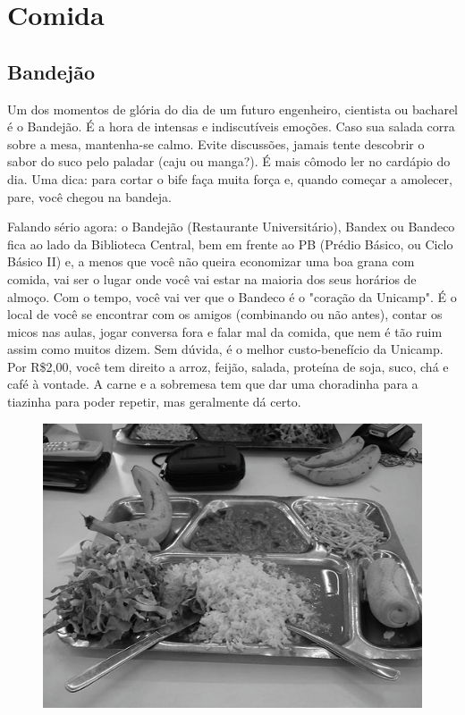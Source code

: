 
\section{Comida}
\subsection{Bandejão}

Um dos momentos de glória do dia de um futuro engenheiro, cientista ou bacharel
é o Bandejão. É a hora de intensas e indiscutíveis emoções. Caso sua salada
corra sobre a mesa, mantenha-se calmo. Evite discussões, jamais tente descobrir
o sabor do suco pelo paladar (caju ou manga?). É mais cômodo ler no cardápio
do dia. Uma dica: para cortar o bife faça muita força e, quando começar
a amolecer, pare, você chegou na bandeja.

Falando sério agora: o Bandejão (Restaurante Universitário), Bandex ou Bandeco
fica ao lado da Biblioteca Central, bem em frente ao PB (Prédio Básico, ou Ciclo
Básico II) e, a menos que você não queira economizar uma boa grana com comida,
vai ser o lugar onde você vai estar na maioria dos seus horários de almoço. Com
o tempo, você vai ver que o Bandeco é o "coração da Unicamp". É o local de você
se encontrar com os amigos (combinando ou não antes), contar os micos nas aulas,
jogar conversa fora e falar mal da comida, que nem é tão ruim assim como muitos
dizem. Sem dúvida, é o melhor custo-benefício da Unicamp. Por R\$2,00, você tem
direito a arroz, feijão, salada, proteína de soja, suco, chá e café à vontade.
A carne e a sobremesa tem que dar uma choradinha para a tiazinha para poder
repetir, mas geralmente dá certo.

\begin{figure}[h!]
    \centering
    \includegraphics[scale=0.58,keepaspectratio=true]{img/imgs/6-comida/-038.jpg}
\end{figure}

